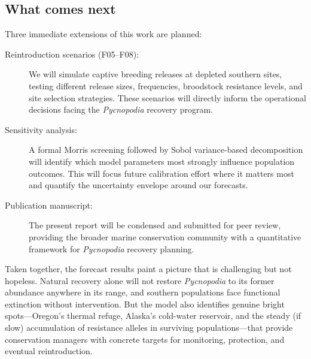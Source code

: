 \subsection{What comes next}

Three immediate extensions of this work are planned:

\begin{description}
  \item[Reintroduction scenarios (F05--F08):]  We will simulate captive
    breeding releases at depleted southern sites, testing different
    release sizes, frequencies, broodstock resistance levels, and site
    selection strategies.  These scenarios will directly inform the
    operational decisions facing the \textit{Pycnopodia} recovery
    program.

  \item[Sensitivity analysis:]  A formal Morris screening followed by
    Sobol variance-based decomposition will identify which model
    parameters most strongly influence population outcomes.  This will
    focus future calibration effort where it matters most and quantify
    the uncertainty envelope around our forecasts.

  \item[Publication manuscript:]  The present report will be condensed
    and submitted for peer review, providing the broader marine
    conservation community with a quantitative framework for
    \textit{Pycnopodia} recovery planning.
\end{description}

Taken together, the forecast results paint a picture that is challenging
but not hopeless.  Natural recovery alone will not restore
\textit{Pycnopodia} to its former abundance anywhere in its range, and
southern populations face functional extinction without intervention.
But the model also identifies genuine bright spots---Oregon's thermal
refuge, Alaska's cold-water reservoir, and the steady (if slow)
accumulation of resistance alleles in surviving populations---that
provide conservation managers with concrete targets for monitoring,
protection, and eventual reintroduction.
